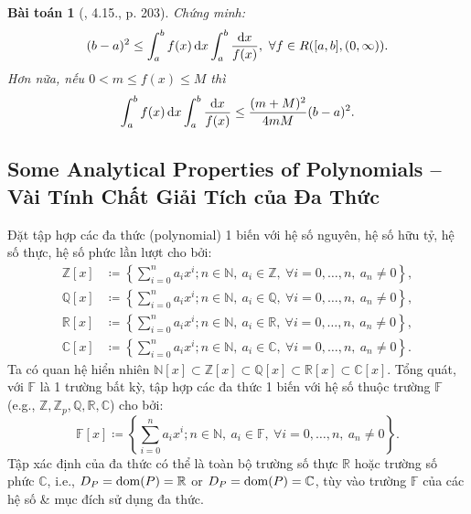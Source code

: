 \documentclass{article}
\newtheorem{baitoan}{Bài toán}
\begin{document}
\begin{baitoan}[\cite{Quoc_Long_Dat_Nam_VMC}, 4.15., p. 203]
	Chứng minh:
	\begin{equation*}
		(b - a)^2\le\int_a^b f(x)\,{\rm d}x\int_a^b \frac{{\rm d}x}{f(x)},\ \forall f\in R([a,b],(0,\infty)).
	\end{equation*}
	Hơn nữa, nếu $0 < m\le f(x)\le M$ thì
	\begin{equation*}
		\int_a^b f(x)\,{\rm d}x\int_a^b \frac{{\rm d}x}{f(x)}\le\frac{(m + M)^2}{4mM}(b - a)^2.
	\end{equation*}
\end{baitoan}


\subsection{Some Analytical Properties of Polynomials -- Vài Tính Chất Giải Tích của Đa Thức}
Đặt tập hợp các đa thức (polynomial) 1 biến với hệ số nguyên, hệ số hữu tỷ, hệ số thực, hệ số phức lần lượt cho bởi:
\begin{align*}
	\mathbb{Z}[x]&\coloneqq\left\{\sum_{i=0}^n a_ix^i;n\in\mathbb{N},\ a_i\in\mathbb{Z},\ \forall i = 0,\ldots,n,\ a_n\ne0\right\},\\
	\mathbb{Q}[x]&\coloneqq\left\{\sum_{i=0}^n a_ix^i;n\in\mathbb{N},\ a_i\in\mathbb{Q},\ \forall i = 0,\ldots,n,\ a_n\ne0\right\},\\
	\mathbb{R}[x]&\coloneqq\left\{\sum_{i=0}^n a_ix^i;n\in\mathbb{N},\ a_i\in\mathbb{R},\ \forall i = 0,\ldots,n,\ a_n\ne0\right\},\\
	\mathbb{C}[x]&\coloneqq\left\{\sum_{i=0}^n a_ix^i;n\in\mathbb{N},\ a_i\in\mathbb{C},\ \forall i = 0,\ldots,n,\ a_n\ne0\right\}.
\end{align*}
Ta có quan hệ hiển nhiên $\mathbb{N}[x]\subset\mathbb{Z}[x]\subset\mathbb{Q}[x]\subset\mathbb{R}[x]\subset\mathbb{C}[x]$. Tổng quát, với $\mathbb{F}$ là 1 trường bất kỳ, tập hợp các đa thức 1 biến với hệ số thuộc trường $\mathbb{F}$ (e.g., $\mathbb{Z},\mathbb{Z}_p,\mathbb{Q},\mathbb{R},\mathbb{C}$) cho bởi:
\begin{equation*}
	\mathbb{F}[x]\coloneqq\left\{\sum_{i=0}^n a_ix^i;n\in\mathbb{N},\ a_i\in\mathbb{F},\ \forall i = 0,\ldots,n,\ a_n\ne0\right\}.
\end{equation*}
Tập xác định của đa thức có thể là toàn bộ trường số thực $\mathbb{R}$ hoặc trường số phức $\mathbb{C}$, i.e., $D_P = {\rm dom}(P) = \mathbb{R}$ or $D_P = {\rm dom}(P) = \mathbb{C}$, tùy vào trường $\mathbb{F}$ của các hệ số \& mục đích sử dụng đa thức.
\end{document}
